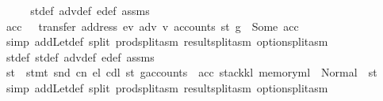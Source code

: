 \begin{isabellebody}
\ \ \isamarkupfalse%
\ \isamarkupfalse%
\ st{}{\isacharunderscore}{\kern0pt}def\ adv{}{\isacharunderscore}{\kern0pt}def\ e{\isacharprime}{\kern0pt}{\isacharunderscore}{\kern0pt}def\ assms\ {}\ {}\ {}\ {}\ {}\ \isamarkupfalse%
\ acc\ \ {}{\isacharcolon}{\kern0pt}\ {\isachardoublequoteopen}transfer\ {\isacharparenleft}{\kern0pt}address\ ev{\isacharparenright}{\kern0pt}\ adv{}\ v\ {\isacharparenleft}{\kern0pt}accounts\ {\isacharparenleft}{\kern0pt}st{}\ g{\isacharprime}{\kern0pt}{\isacharparenright}{\kern0pt}{\isacharparenright}{\kern0pt}\ {\isacharequal}{\kern0pt}\ Some\ acc{\isachardoublequoteclose}\ \isamarkupfalse%
\ {\isacharparenleft}{\kern0pt}simp\ add{\isacharcolon}{\kern0pt}Let{\isacharunderscore}{\kern0pt}def\ split{\isacharcolon}{\kern0pt}\ prod{\isachardot}{\kern0pt}split{\isacharunderscore}{\kern0pt}asm\ result{\isachardot}{\kern0pt}split{\isacharunderscore}{\kern0pt}asm\ option{\isachardot}{\kern0pt}split{\isacharunderscore}{\kern0pt}asm{\isacharparenright}{\kern0pt}\isanewline
\ \ \isamarkupfalse%
\ \isamarkupfalse%
\ st{}{\isacharunderscore}{\kern0pt}def\ st{}{\isacharunderscore}{\kern0pt}def\ adv{}{\isacharunderscore}{\kern0pt}def\ e{\isacharprime}{\kern0pt}{\isacharunderscore}{\kern0pt}def\ assms\ {}\ {}\ {}\ {}\ {}\ {}\ \isamarkupfalse%
\ st{\isacharprime}{\kern0pt}{\isacharprime}{\kern0pt}\ \ {\isachardoublequoteopen}stmt\ {\isacharparenleft}{\kern0pt}snd\ cn{\isacharparenright}{\kern0pt}\ e\isactrlsub l\ cd\isactrlsub l\ {\isacharparenleft}{\kern0pt}st{}\ g{\isacharprime}{\kern0pt}{\isasymlparr}accounts\ {\isacharcolon}{\kern0pt}{\isacharequal}{\kern0pt}\ acc{\isacharcomma}{\kern0pt}\ stack{\isacharcolon}{\kern0pt}{\isacharequal}{\kern0pt}k\isactrlsub l{\isacharcomma}{\kern0pt}\ memory{\isacharcolon}{\kern0pt}{\isacharequal}{\kern0pt}m\isactrlsub l{\isasymrparr}{\isacharparenright}{\kern0pt}\ {\isacharequal}{\kern0pt}\ Normal\ {\isacharparenleft}{\kern0pt}{\isacharparenleft}{\kern0pt}{\isacharparenright}{\kern0pt}{\isacharcomma}{\kern0pt}\ st{\isacharprime}{\kern0pt}{\isacharprime}{\kern0pt}{\isacharparenright}{\kern0pt}{\isachardoublequoteclose}\ \isamarkupfalse%
\ {\isacharparenleft}{\kern0pt}simp\ add{\isacharcolon}{\kern0pt}Let{\isacharunderscore}{\kern0pt}def\ split{\isacharcolon}{\kern0pt}\ prod{\isachardot}{\kern0pt}split{\isacharunderscore}{\kern0pt}asm\ result{\isachardot}{\kern0pt}split{\isacharunderscore}{\kern0pt}asm\ option{\isachardot}{\kern0pt}split{\isacharunderscore}{\kern0pt}asm{\isacharparenright}{\kern0pt}\isanewline

\end{isabellebody}
